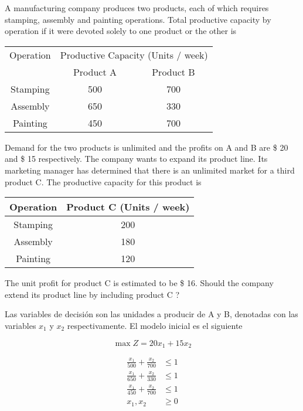 \documentclass[../main.tex]{subfiles}
\begin{document}

\begin{questions}
\question %

A manufacturing company produces two products, each of which requires stamping, assembly and painting operations. Total productive capacity by operation if it were devoted solely to one product or the other is

{\centering
  \begin{tabular}{ccc}
    \toprule
    Operation& \multicolumn{2}{c}{Productive Capacity (Units / week)} \\
    \cmidrule{2-3}
             &Product A& Product B \\
    \midrule
    Stamping & 500 & 700\\
    Assembly & 650 & 330\\
    Painting & 450 & 700\\
       \bottomrule
  \end{tabular}
  \par}

Demand for the two products is unlimited and the profits on A and B are \$ 20 and \$ 15 respectively. The company wants to expand its product line. Its marketing manager has determined that there is an unlimited market for a third product C. The productive capacity for
this product is

{\centering
  \begin{tabular}{cc}
    \toprule
    Operation& Product C (Units / week) \\
    \midrule
    Stamping & 200 \\
    Assembly & 180 \\
    Painting & 120 \\
       \bottomrule
  \end{tabular}
  \par}

The unit profit for product C is estimated to be \$ 16. Should the company extend its product line by including product C ?


\begin{solution}{}
  Las variables de decisión son las unidades a producir de A y B, denotadas con las variables $x_1$ y $x_2$ respectivamente.  El modelo inicial es el siguiente
  
  \[\max Z = 20x_1 + 15x_2  \]

  \begin{align*}
    \frac{x_1}{500} + \frac{x_2}{700}   &\leq 1\\[3mm]
\frac{x_1}{650} + \frac{x_2}{330}  &\leq 1\\[3mm]
    \frac{x_1}{450} + \frac{x_2}{700}   &\leq 1\\[3mm]
    x_1, x_2 &\geq 0
  \end{align*}
  


\end{solution}
\end{questions}
\end{document}
